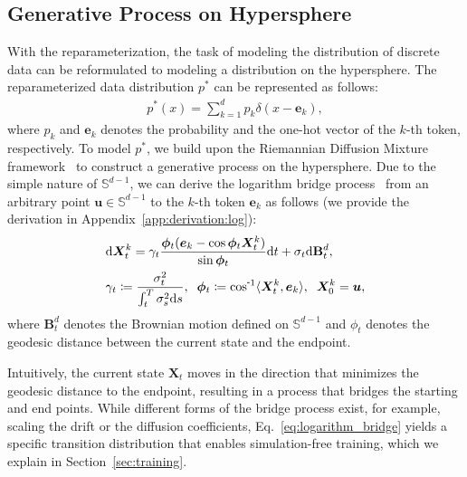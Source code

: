 \subsection{Generative Process on Hypersphere}

With the reparameterization, the task of modeling the distribution of discrete data can be reformulated to modeling a distribution on the hypersphere.
The reparameterized data distribution $p^{\ast}$ can be represented as follows:
\begin{align}
    p^{\ast}(x) = \sum^{d}_{k=1} p_k \delta(x - {\bm{e}_k}),
\end{align}
where $p_k$ and $\bm{e}_k$ denotes the probability and the one-hot vector of the $k$-th token, respectively.
To model $p^{\ast}$, we build upon the Riemannian Diffusion Mixture framework~\citep{jo2024riemannian} to construct a generative process on the hypersphere.
Due to the simple nature of $\mathbb{S}^{d-1}$, we can derive the logarithm bridge process~\citep{jo2024riemannian} from an arbitrary point $\bm{u}\in\mathbb{S}^{d-1}$ to the $k$-th token $\bm{e}_k$ as follows (we provide the derivation in Appendix~\ref{app:derivation:log}):
\begin{align}
\begin{split}
     &\mathrm{d}\bm{X}^{k}_t = \gamma_t
     \frac{\bm{\phi}_t(\bm{e}_k - \cos\bm{\phi}_t \bm{X}^{k}_t)}{\sin\bm{\phi}_t} \mathrm{d}t + \sigma_t\mathrm{d}\mathbf{B}^{d}_t, \\
     &\gamma_t \coloneqq  \frac{\sigma_t^2}{\int^T_t\sigma^2_s\mathrm{d}s}, \;\;
     \bm{\phi}_t \coloneqq \invcos\langle\bm{X}^{k}_t, \bm{e}_k \rangle, \;\; \bm{X}^{k}_0=\bm{u},
\end{split}
\label{eq:logarithm_bridge}
\end{align}
where $\mathbf{B}^{d}_t$ denotes the Brownian motion defined on $\mathbb{S}^{d-1}$ and $\phi_t$ denotes the geodesic distance between the current state and the endpoint.

Intuitively, the current state $\bm{X}_t$ moves in the direction that minimizes the geodesic distance to the endpoint, resulting in a process that bridges the starting and end points.
While different forms of the bridge process exist, for example, scaling the drift or the diffusion coefficients, Eq.~\eqref{eq:logarithm_bridge} yields a specific transition distribution that enables simulation-free training, which we explain in Section~\ref{sec:training}.


